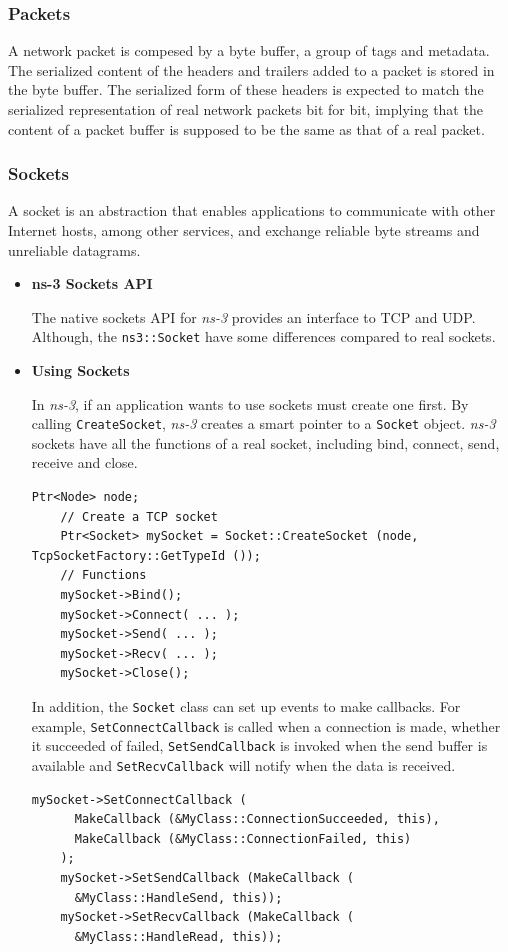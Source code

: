 \subsubsection{Packets}
A network packet is compesed by a byte buffer, a group of tags and metadata.
The serialized content of the headers and trailers added to a packet is stored in the byte buffer. 
The serialized form of these headers is expected to match the serialized representation of real 
network packets bit for bit, implying that the content of a packet buffer is supposed to be the 
same as that of a real packet.

\subsubsection{Sockets}
A socket is an abstraction that enables applications to communicate with other Internet hosts, among other services,
and exchange reliable byte streams and unreliable datagrams.

\begin{itemize}
  \item \textbf{ns-3 Sockets API} 
  
  The native sockets API for \textit{ns-3} provides an interface 
  to TCP and UDP. Although, the \texttt{ns3::Socket} have some differences compared to
  real sockets. 

  \item \textbf{Using Sockets} 

  In \textit{ns-3}, if an application wants to use sockets must create one first. By 
  calling \texttt{CreateSocket}, \textit{ns-3} creates a smart pointer to a \texttt{Socket} object.
  \textit{ns-3} sockets have all the functions of a real socket, including bind, connect, send, receive
  and close.

  \begin{lstlisting}[language=myC++, caption={ns-3 Socket programming}, captionpos=b]
    Ptr<Node> node;
    // Create a TCP socket
    Ptr<Socket> mySocket = Socket::CreateSocket (node, TcpSocketFactory::GetTypeId ());
    // Functions
    mySocket->Bind();
    mySocket->Connect( ... );
    mySocket->Send( ... );
    mySocket->Recv( ... );
    mySocket->Close();
  \end{lstlisting}

  In addition, the \texttt{Socket} class can set up events to make callbacks. For example, 
  \texttt{SetConnectCallback} is called when a connection is made, whether it succeeded of 
  failed, \texttt{SetSendCallback} is invoked when the send buffer is available
  and \texttt{SetRecvCallback} will notify when the data is received.

  \begin{lstlisting}[language=myC++, caption={Socket callbacks}, captionpos=b]
    mySocket->SetConnectCallback (
      MakeCallback (&MyClass::ConnectionSucceeded, this),
      MakeCallback (&MyClass::ConnectionFailed, this)
    );
    mySocket->SetSendCallback (MakeCallback (
      &MyClass::HandleSend, this));
    mySocket->SetRecvCallback (MakeCallback (
      &MyClass::HandleRead, this));
  \end{lstlisting}
\end{itemize}

